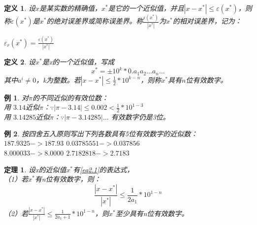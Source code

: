 \documentclass[a4paper]{article}
\newtheorem{definition}{定义}[section]
\newtheorem{theorem}{定理}[section]
\newtheorem{example}{例}[section]
\begin{document}
\begin{definition}
设$x$是某实数的精确值，$x^*$是它的一个近似值，并且$|x-x^*| \le \varepsilon(x^*) $，则称$\varepsilon(x^*)$是$x^*$的绝对误差界或简称误差界。称$\frac{\epsilon(x^*)}{|x^*|}$为$x^*$的相对误差界，记为：\\
\centerline{ $\varepsilon_{r}(x^*)=\frac{\varepsilon(x^*)}{|x^*|}$}
\end{definition}

\begin{definition}
设$x^*$是x的一个近似值，写成
\begin{equation}
\label{eq2.1}
x^*=\pm 10^k * 0.a_{1}a_{2} \dots a_{n} \dots 
\end{equation}
其中$a^i \neq 0$，k为整数。若$|x-x^*| \le \frac{1}{2}*10^{k-n}$，则称$x^*$具有$n$位有效数字。\\
\end{definition}

\begin{example}
对$\pi$的不同近似的有效位数：\\
用 $3.14$近似$\pi$：$\because |\pi-3.14| \le 0.002 < \frac{1}{2}*10^{1-3}$ \\
用 $3.14285$近似$\pi$：$\because |\pi-3.14285| \dots $ 有效数字仍是3位。\\
\end{example}
\begin{example}
按四舍五入原则写出下列各数具有5位有效数字的近似数：\\
$187.9325 -> 187.93$ \quad $0.03785551 -> 0.037856$ \\
$8.000033 -> 8.0000$ \quad $2.7182818 -> 2.7183$ \\
\end{example}

\begin{theorem}
设x的近似值$x^*$有\ref{eq2.1}的表达式，\\
（1）若$x^*$有n位有效数字，则：
\begin{equation}
\frac{|x-x^*|}{|x^*|} \le \frac{1}{2a_1}*10^{1-n}
\end{equation}
（2）若$\frac{|x-x^*|}{|x^*|} \le \frac{1}{2a_1+1}*10^{1-n}$，则$x^*$至少具有n位有效数字。
\end{theorem}
\end{document}
